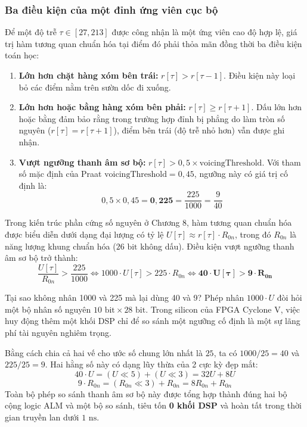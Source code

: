\subsubsection*{Ba điều kiện của một đỉnh ứng viên cục bộ}
Để một độ trễ $\tau \in [27, 213]$ được công nhận là một ứng viên cao độ hợp lệ, giá trị hàm tương quan chuẩn hóa tại điểm đó phải thỏa mãn đồng thời ba điều kiện toán học:
\begin{enumerate}[leftmargin=2em, itemsep=2pt]
    \item \textbf{Lớn hơn chặt hàng xóm bên trái:} $r[\tau] > r[\tau - 1]$. Điều kiện này loại bỏ các điểm nằm trên sườn dốc đi xuống.
    \item \textbf{Lớn hơn hoặc bằng hàng xóm bên phải:} $r[\tau] \ge r[\tau + 1]$. Dấu lớn hơn hoặc bằng đảm bảo rằng trong trường hợp đỉnh bị phẳng do làm tròn số nguyên ($r[\tau] = r[\tau+1]$), điểm bên trái (độ trễ nhỏ hơn) vẫn được ghi nhận.
    \item \textbf{Vượt ngưỡng thanh âm sơ bộ:} $r[\tau] > 0{,}5 \times \text{voicingThreshold}$. Với tham số mặc định của Praat $\text{voicingThreshold} = 0{,}45$, ngưỡng này có giá trị cố định là:
    \begin{equation}
    0{,}5 \times 0{,}45 = \mathbf{0{,}225} = \frac{225}{1000} = \frac{9}{40}
    \end{equation}
\end{enumerate}

Trong kiến trúc phần cứng số nguyên ở Chương 8, hàm tương quan chuẩn hóa được biểu diễn dưới dạng đại lượng có tỷ lệ $U[\tau] \approx r[\tau] \cdot R_{0n}$, trong đó $R_{0n}$ là năng lượng khung chuẩn hóa ($26\text{ bit}$ không dấu). Điều kiện vượt ngưỡng thanh âm sơ bộ trở thành:
\begin{equation}
\frac{U[\tau]}{R_{0n}} > \frac{225}{1000} \iff 1000 \cdot U[\tau] > 225 \cdot R_{0n} \iff \mathbf{40 \cdot U[\tau] > 9 \cdot R_{0n}}
\end{equation}

\begin{thoughtqa}{Tại sao không nhân 1000 và 225 mà lại dùng 40 và 9?}
Phép nhân $1000 \cdot U$ đòi hỏi một bộ nhân số nguyên $10\text{ bit} \times 28\text{ bit}$. Trong silicon của FPGA Cyclone V, việc huy động thêm một khối DSP chỉ để so sánh một ngưỡng cố định là một sự lãng phí tài nguyên nghiêm trọng. 

Bằng cách chia cả hai vế cho ước số chung lớn nhất là $25$, ta có $1000 / 25 = 40$ và $225 / 25 = 9$. Hai hằng số này có dạng lũy thừa của 2 cực kỳ đẹp mắt:
\begin{equation}
40 \cdot U = (U \ll 5) + (U \ll 3) = 32U + 8U
\end{equation}
\begin{equation}
9 \cdot R_{0n} = (R_{0n} \ll 3) + R_{0n} = 8R_{0n} + R_{0n}
\end{equation}
Toàn bộ phép so sánh thanh âm sơ bộ này được tổng hợp thành đúng hai bộ cộng logic ALM và một bộ so sánh, tiêu tốn \textbf{0 khối DSP} và hoàn tất trong thời gian truyền lan dưới $1\text{ ns}$.
\end{thoughtqa}


